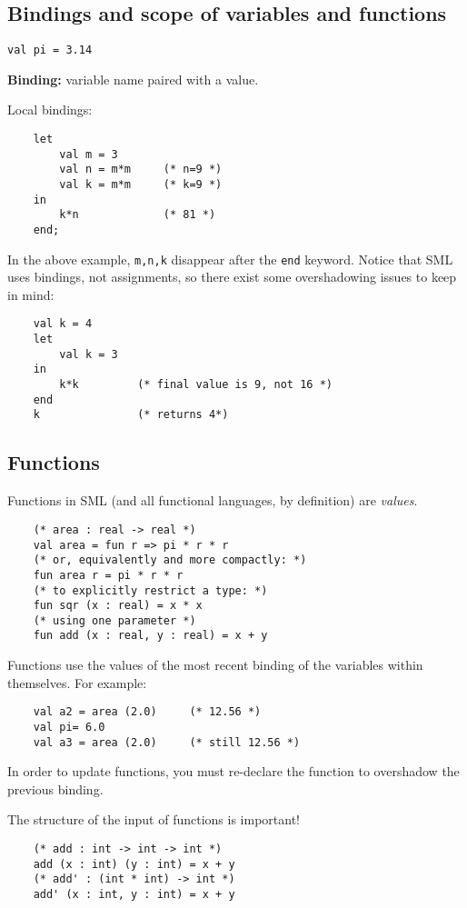 \documentclass[11pt]{article}
\begin{document}
\subsection{Bindings and scope of variables and functions}
\verb~val pi = 3.14~

\textbf{Binding:} variable name paired with a value.

Local bindings:
\begin{verbatim}
    let
        val m = 3
        val n = m*m     (* n=9 *)
        val k = m*m     (* k=9 *)
    in
        k*n             (* 81 *)
    end;
\end{verbatim}

In the above example, \verb!m,n,k! disappear after the \verb~end~ keyword. Notice that SML uses bindings, not assignments, so there exist some overshadowing issues to keep in mind:
\begin{verbatim}
    val k = 4
    let
        val k = 3
    in
        k*k         (* final value is 9, not 16 *)
    end
    k               (* returns 4*)
\end{verbatim}

\subsection{Functions}
Functions in SML (and all functional languages, by definition) are \emph{values}.
\begin{verbatim}
    (* area : real -> real *)
    val area = fun r => pi * r * r
    (* or, equivalently and more compactly: *)
    fun area r = pi * r * r
    (* to explicitly restrict a type: *)
    fun sqr (x : real) = x * x
    (* using one parameter *)
    fun add (x : real, y : real) = x + y
\end{verbatim}
Functions use the values of the most recent binding of the variables within themselves. For example:
\begin{verbatim}
    val a2 = area (2.0)     (* 12.56 *)
    val pi= 6.0
    val a3 = area (2.0)     (* still 12.56 *)
\end{verbatim}
In order to update functions, you must re-declare the function to overshadow the previous binding.

The structure of the input of functions is important!
\begin{verbatim}
    (* add : int -> int -> int *)
    add (x : int) (y : int) = x + y
    (* add' : (int * int) -> int *)
    add' (x : int, y : int) = x + y
\end{verbatim}
\end{document}
